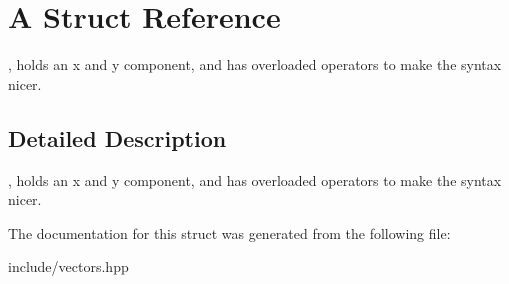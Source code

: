 \hypertarget{struct_a}{\section{A Struct Reference}
\label{struct_a}
}


, holds an x and y component, and has overloaded operators to make the syntax nicer.  




\subsection{Detailed Description}
, holds an x and y component, and has overloaded operators to make the syntax nicer. 

The documentation for this struct was generated from the following file\-:\begin{DoxyCompactItemize}
\item 
include/vectors.\-hpp\end{DoxyCompactItemize}
